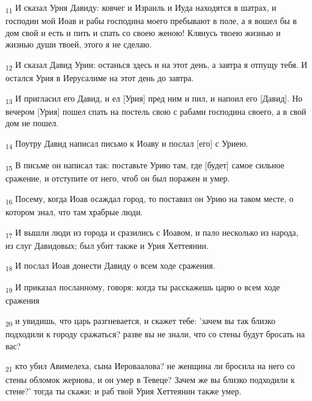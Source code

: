 \begin{tcolorbox}
\textsubscript{11} И сказал Урия Давиду: ковчег и Израиль и Иуда находятся в шатрах, и господин мой Иоав и рабы господина моего пребывают в поле, а я вошел бы в дом свой и есть и пить и спать со своею женою! Клянусь твоею жизнью и жизнью души твоей, этого я не сделаю.
\end{tcolorbox}
\begin{tcolorbox}
\textsubscript{12} И сказал Давид Урии: останься здесь и на этот день, а завтра я отпущу тебя. И остался Урия в Иерусалиме на этот день до завтра.
\end{tcolorbox}
\begin{tcolorbox}
\textsubscript{13} И пригласил его Давид, и ел [Урия] пред ним и пил, и напоил его [Давид]. Но вечером [Урия] пошел спать на постель свою с рабами господина своего, а в свой дом не пошел.
\end{tcolorbox}
\begin{tcolorbox}
\textsubscript{14} Поутру Давид написал письмо к Иоаву и послал [его] с Уриею.
\end{tcolorbox}
\begin{tcolorbox}
\textsubscript{15} В письме он написал так: поставьте Урию там, где [будет] самое сильное сражение, и отступите от него, чтоб он был поражен и умер.
\end{tcolorbox}
\begin{tcolorbox}
\textsubscript{16} Посему, когда Иоав осаждал город, то поставил он Урию на таком месте, о котором знал, что там храбрые люди.
\end{tcolorbox}
\begin{tcolorbox}
\textsubscript{17} И вышли люди из города и сразились с Иоавом, и пало несколько из народа, из слуг Давидовых; был убит также и Урия Хеттеянин.
\end{tcolorbox}
\begin{tcolorbox}
\textsubscript{18} И послал Иоав донести Давиду о всем ходе сражения.
\end{tcolorbox}
\begin{tcolorbox}
\textsubscript{19} И приказал посланному, говоря: когда ты расскажешь царю о всем ходе сражения
\end{tcolorbox}
\begin{tcolorbox}
\textsubscript{20} и увидишь, что царь разгневается, и скажет тебе: 'зачем вы так близко подходили к городу сражаться? разве вы не знали, что со стены будут бросать на вас?
\end{tcolorbox}
\begin{tcolorbox}
\textsubscript{21} кто убил Авимелеха, сына Иероваалова? не женщина ли бросила на него со стены обломок жернова, и он умер в Тевеце? Зачем же вы близко подходили к стене?' тогда ты скажи: и раб твой Урия Хеттеянин также умер.
\end{tcolorbox}
